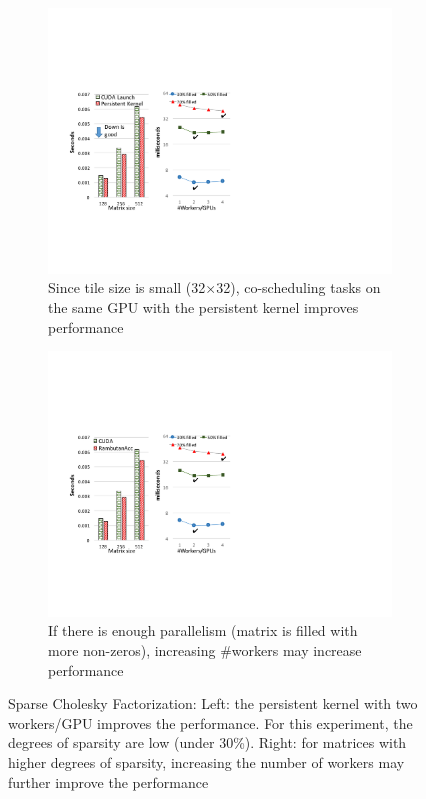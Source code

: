 \begin{figure}[htb]
\centering
\begin{subfigure}{0.25\textwidth}
\includegraphics[width=\textwidth]{figures/choleskyScheResults.pdf}
\caption{Since tile size is small (32$\times$32), co-scheduling tasks on the same GPU with the persistent kernel improves performance}
\label{choleskySche}
\end{subfigure}
\begin{subfigure}{0.222\textwidth}
\includegraphics[width=\textwidth]{figures/nWorkers.pdf}
\caption{If there is enough parallelism (matrix is filled with more non-zeros), increasing \#workers may increase performance}
\label{fig:nWorkers}
\end{subfigure}
\caption{Sparse Cholesky Factorization: Left: the persistent kernel with two workers/GPU improves the performance. For this experiment, the degrees of sparsity are low (under 30\%). Right: for matrices with higher degrees of sparsity, increasing the number of workers  may further improve the performance}
\label{fig:coarseFine}
\end{figure}

